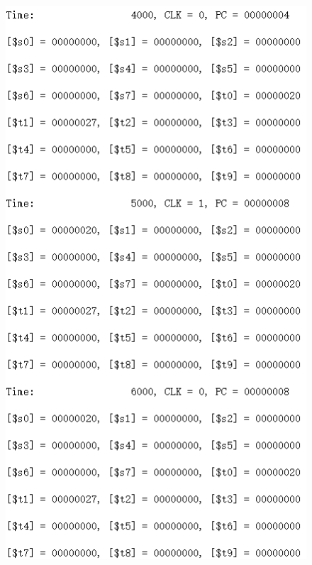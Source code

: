 \documentclass[12pt]{article}
\begin{document}
\begin{figure}[H]
\centering
\includegraphics[scale=1]{R2.jpg}
\end{figure}
\end{document}
